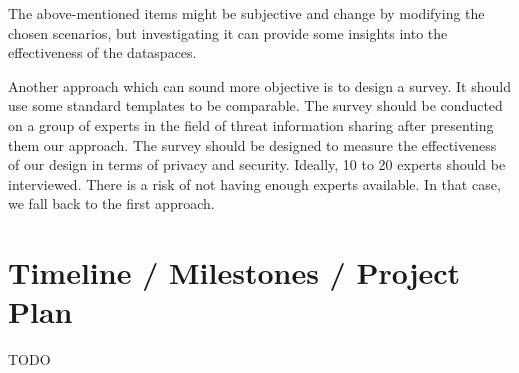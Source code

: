 \documentclass{article}
\begin{document}
The above-mentioned items might be subjective and change by modifying the chosen scenarios, but investigating it can provide some insights into the effectiveness of the dataspaces.

Another approach which can sound more objective is to design a survey. It should use some standard templates to be comparable. The survey should be conducted on a group of experts in the field of threat information sharing after presenting them our approach. The survey should be designed to measure the effectiveness of our design in terms of privacy and security. Ideally, 10 to 20 experts should be interviewed. There is a risk of not having enough experts available. In that case, we fall back to the first approach.


\section{Timeline / Milestones / Project Plan} %
\label{sec:timeline}

TODO

\newpage


 

\end{document}
